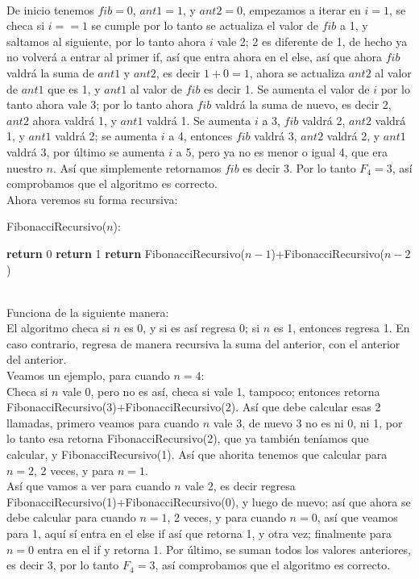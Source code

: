 \documentclass[12pt,twoside]{article}
\begin{document}
\\ De inicio tenemos $fib = 0$, $ant1=1$, y $ant2=0$, empezamos a iterar en $i=1$, se checa si $i==1$ se cumple por lo tanto se actualiza el valor de $fib$ a 1, y saltamos al siguiente, por lo tanto ahora $i$ vale 2; 2 es diferente de 1, de hecho ya no volverá a entrar al primer if, así que entra ahora en el else, así que ahora $fib$ valdrá la suma de $ant1$ y $ant2$, es decir $1+0=1$, ahora se actualiza $ant2$ al valor de $ant1$ que es 1, y $ant1$ al valor de $fib$ es decir 1. Se aumenta el valor de $i$ por lo tanto ahora vale 3; por lo tanto ahora $fib$ valdrá la suma de nuevo, es decir 2, $ant2$ ahora valdrá 1, y $ant1$ valdrá 1. Se aumenta $i$ a 3, $fib$ valdrá 2, $ant2$ valdrá 1, y $ant1$ valdrá 2; se aumenta $i$ a 4, entonces $fib$ valdrá 3, $ant2$ valdrá 2, y $ant1$ valdrá 3, por último se aumenta $i$ a 5, pero ya no es menor o igual 4, que era nuestro $n$. Así que simplemente retornamos $fib$ es decir 3. Por lo tanto $F_4 =3$, así comprobamos que el algoritmo es correcto.  
\newline
\\ Ahora veremos su forma recursiva:
\begin{algorithm}
    \caption{FibonacciRecursivo($n$):}
    \begin{algorithmic}
            \State \textbf{return} 0
            \State \textbf{return} 1
        \Else
        \State \textbf{return} FibonacciRecursivo($n-1$)+FibonacciRecursivo($n-2$)
        \EndIf 
    \end{algorithmic}
\end{algorithm}
\\ Funciona de la siguiente manera:
\\ El algoritmo checa si $n$ es 0, y si es así regresa 0; si $n$ es 1, entonces regresa 1. En caso contrario, regresa de manera recursiva la suma del anterior, con el anterior del anterior.
\newline
\\ Veamos un ejemplo, para cuando $n=4$:
\\ Checa si $n$ vale 0, pero no es así, checa si vale 1, tampoco; entonces retorna FibonacciRecursivo(3)+FibonacciRecursivo(2). Así que debe calcular esas 2 llamadas, primero veamos para cuando $n$ vale 3, de nuevo 3 no es ni 0, ni 1, por lo tanto esa retorna FibonacciRecursivo(2), que ya también teníamos que calcular, y FibonacciRecursivo(1). Así que ahorita tenemos que calcular para $n = 2$, 2 veces, y para $n=1$.
\\ Así que vamos a ver para cuando $n$ vale 2, es decir regresa FibonacciRecursivo(1)+FibonacciRecursivo(0), y luego de nuevo; así que ahora se debe calcular para cuando $n=1$, 2 veces, y para cuando $n=0$, así que veamos para 1, aquí sí entra en el else if así que retorna 1, y otra vez; finalmente para $n=0$ entra en el if y retorna 1. Por último, se suman todos los valores anteriores, es decir 3, por lo tanto $F_4=3$, así comprobamos que el algoritmo es correcto.
\end{document}
